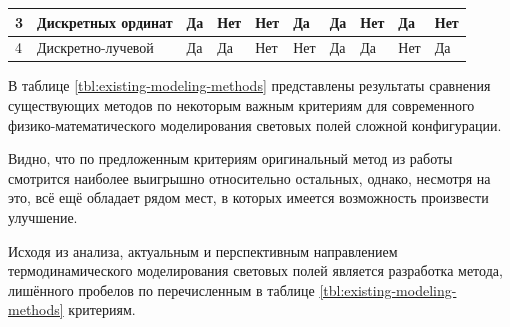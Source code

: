 \begin{FixLineStretch}
\begin{table}
\begin{tabular}{|p{\wA}|p{\wB}|p{\wC}|p{\wD}|p{\wE}|p{\wF}|p{\wG}|p{\wH}|p{\wI}|p{\wJ}|}
		3                    & \everypar{\hspace*{0pt}} Дискретных ординат \cite{surzhikov}                                            & Да                                                           & Нет                                                                             & Нет                                                                               & Да                                                       & Да                                                                                             & Нет                                                                                                        & Да                                                           & Нет                                      \\ \hline
		4                    & \everypar{\hspace*{0pt}} Дискретно-лучевой \cite{gradov-dissertation}                                   & Да                                                           & Да                                                                              & Нет                                                                               & Нет                                                      & Да                                                                                             & Да                                                                                                         & Нет                                                          & Да                                       \\ \hline
	\end{tabular}
\end{table}
\end{FixLineStretch}
\let\wJ\relax
\let\wI\relax
\let\wH\relax
\let\wG\relax
\let\wF\relax
\let\wE\relax
\let\wD\relax
\let\wC\relax
\let\wB\relax
\let\wA\relax

В таблице \ref{tbl:existing-modeling-methods} представлены результаты сравнения существующих методов по некоторым важным критериям для современного физико-математического моделирования световых полей сложной конфигурации.

Видно, что по предложенным критериям оригинальный метод из работы \cite{gradov-dissertation} смотрится наиболее выигрышно относительно остальных, однако, несмотря на это, всё ещё обладает рядом мест, в которых имеется возможность произвести улучшение.

Исходя из анализа, актуальным и перспективным направлением термодинамического моделирования световых полей является разработка метода, лишённого пробелов по перечисленным в таблице \ref{tbl:existing-modeling-methods} критериям.

